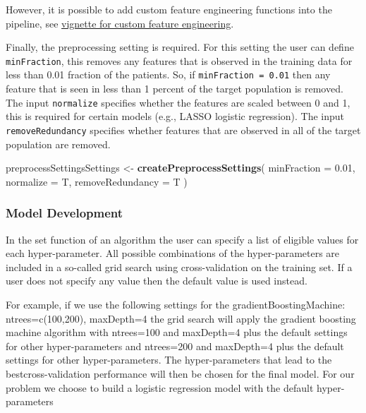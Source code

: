 \documentclass[
]{article}
\newenvironment{Shaded}{\begin{snugshade}}{\end{snugshade}}
\newcommand{\AttributeTok}[1]{\textcolor[rgb]{0.13,0.29,0.53}{#1}}
\newcommand{\FloatTok}[1]{\textcolor[rgb]{0.00,0.00,0.81}{#1}}
\newcommand{\FunctionTok}[1]{\textcolor[rgb]{0.13,0.29,0.53}{\textbf{#1}}}
\newcommand{\NormalTok}[1]{#1}
\newcommand{\OtherTok}[1]{\textcolor[rgb]{0.56,0.35,0.01}{#1}}
\begin{document}
However, it is possible to add custom feature engineering functions into
the pipeline, see
\href{https://github.com/OHDSI/PatientLevelPrediction/blob/master/inst/doc/AddingCustomfeatureEngineering.pdf}{vignette
for custom feature engineering}.

Finally, the preprocessing setting is required. For this setting the
user can define \texttt{minFraction}, this removes any features that is
observed in the training data for less than 0.01 fraction of the
patients. So, if \texttt{minFraction\ =\ 0.01} then any feature that is
seen in less than 1 percent of the target population is removed. The
input \texttt{normalize} specifies whether the features are scaled
between 0 and 1, this is required for certain models (e.g., LASSO
logistic regression). The input \texttt{removeRedundancy} specifies
whether features that are observed in all of the target population are
removed.

\begin{Shaded}
\begin{Highlighting}[]
\NormalTok{  preprocessSettingsSettings }\OtherTok{\textless{}{-}} \FunctionTok{createPreprocessSettings}\NormalTok{(}
    \AttributeTok{minFraction =} \FloatTok{0.01}\NormalTok{, }
    \AttributeTok{normalize =}\NormalTok{ T, }
    \AttributeTok{removeRedundancy =}\NormalTok{ T}
\NormalTok{      )}
\end{Highlighting}
\end{Shaded}

\hypertarget{model-development-1}{%
\subsubsection{Model Development}\label{model-development-1}}

In the set function of an algorithm the user can specify a list of
eligible values for each hyper-parameter. All possible combinations of
the hyper-parameters are included in a so-called grid search using
cross-validation on the training set. If a user does not specify any
value then the default value is used instead.

For example, if we use the following settings for the
gradientBoostingMachine: ntrees=c(100,200), maxDepth=4 the grid search
will apply the gradient boosting machine algorithm with ntrees=100 and
maxDepth=4 plus the default settings for other hyper-parameters and
ntrees=200 and maxDepth=4 plus the default settings for other
hyper-parameters. The hyper-parameters that lead to the
bestcross-validation performance will then be chosen for the final
model. For our problem we choose to build a logistic regression model
with the default hyper-parameters
\end{document}
